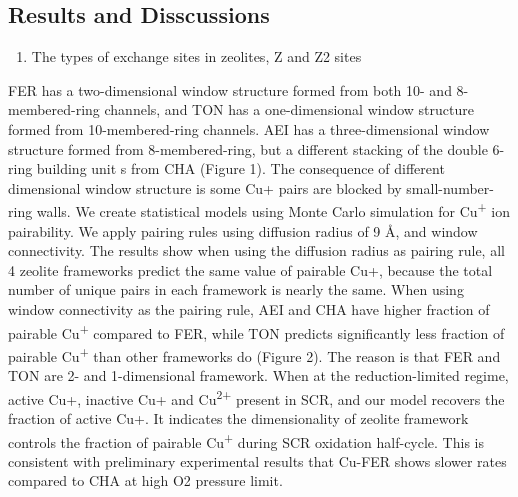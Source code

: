 \documentclass[12pt]{article}
\begin{document}
\subsection*{Results and Disscussions}
\begin{enumerate}
\item The types of exchange sites in zeolites, Z and Z2 sites
\end{enumerate}
FER has a two-dimensional window structure formed from both 10- and 8-membered-ring channels, and TON has a one-dimensional window structure formed from 10-membered-ring channels. AEI has a three-dimensional window structure formed from 8-membered-ring, but a different stacking of the double 6-ring building unit s from CHA (Figure 1). The consequence of different dimensional window structure is some Cu+ pairs are blocked by small-number-ring walls. We create statistical models using Monte Carlo simulation for Cu\textsuperscript{+} ion pairability. We apply pairing rules using diffusion radius of 9 Å, and window connectivity. The results show when using the diffusion radius as pairing rule, all 4 zeolite frameworks predict the same value of pairable Cu+, because the total number of unique pairs in each framework is nearly the same. When using window connectivity as the pairing rule, AEI and CHA have higher fraction of pairable Cu\textsuperscript{+} compared to FER, while TON predicts significantly less fraction of pairable Cu\textsuperscript{+} than other frameworks do (Figure 2). The reason is that FER and TON are 2- and 1-dimensional framework. When at the reduction-limited regime, active Cu+, inactive Cu+ and Cu\textsuperscript{2+} present in SCR, and our model recovers the fraction of active Cu+. It indicates the dimensionality of zeolite framework controls the fraction of pairable Cu\textsuperscript{+} during SCR oxidation half-cycle. This is consistent with preliminary experimental results that Cu-FER shows slower rates compared to CHA at high O2 pressure limit.
\end{document}
